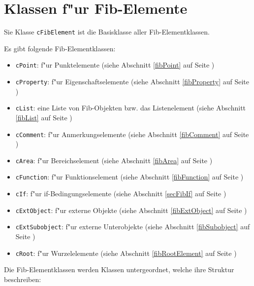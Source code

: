 \section{Klassen f"ur Fib-Elemente}

Sie Klasse \verb|cFibElement| ist die Basisklasse aller Fib-Elementklassen.

\bigskip\noindent
Es gibt folgende Fib-Elementklassen:
\begin{itemize}
 \item \verb|cPoint|: f"ur Punktelemente (siehe Abschnitt \ref{fibPoint} auf Seite \pageref{fibPoint})
 \item \verb|cProperty|: f"ur Eigenschaftselemente (siehe Abschnitt \ref{fibProperty} auf Seite \pageref{fibProperty})
 \item \verb|cList|: eine Liste von Fib-Objekten bzw. das Listenelement (siehe Abschnitt \ref{fibList} auf Seite \pageref{fibList})
 \item \verb|cComment|: f"ur Anmerkungselemente (siehe Abschnitt \ref{fibComment} auf Seite \pageref{fibComment})
 \item \verb|cArea|: f"ur Bereichselement (siehe Abschnitt \ref{fibArea} auf Seite \pageref{fibArea})
 \item \verb|cFunction|: f"ur Funktionselement (siehe Abschnitt \ref{fibFunction} auf Seite \pageref{fibFunction})
 \item \verb|cIf|: f"ur if-Bedingungselemente (siehe Abschnitt \ref{secFibIf} auf Seite \pageref{secFibIf})
 \item \verb|cExtObject|: f"ur externe Objekte (siehe Abschnitt \ref{fibExtObject} auf Seite \pageref{fibExtObject})
 \item \verb|cExtSubobject|: f"ur externe Unterobjekte (siehe Abschnitt \ref{fibSubobject} auf Seite \pageref{fibSubobject})
 \item \verb|cRoot|: f"ur Wurzelelemente (siehe Abschnitt \ref{fibRootElement} auf Seite \pageref{fibRootElement})
\end{itemize}
Die Fib-Elementklassen werden Klassen untergeordnet, welche ihre Struktur beschreiben:
